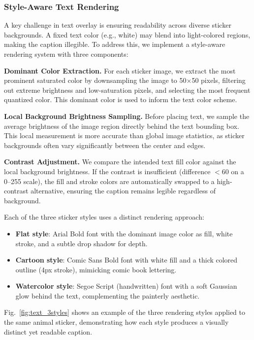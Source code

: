 \subsubsection{\textbf{Style-Aware Text Rendering}}
A key challenge in text overlay is ensuring readability across diverse sticker backgrounds. A fixed text color (e.g., white) may blend into light-colored regions, making the caption illegible. To address this, we implement a style-aware rendering system with three components:

\textbf{Dominant Color Extraction.} For each sticker image, we extract the most prominent saturated color by downsampling the image to 50$\times$50 pixels, filtering out extreme brightness and low-saturation pixels, and selecting the most frequent quantized color. This dominant color is used to inform the text color scheme.

\textbf{Local Background Brightness Sampling.} Before placing text, we sample the average brightness of the image region directly behind the text bounding box. This local measurement is more accurate than global image statistics, as sticker backgrounds often vary significantly between the center and edges.

\textbf{Contrast Adjustment.} We compare the intended text fill color against the local background brightness. If the contrast is insufficient (difference $< 60$ on a 0--255 scale), the fill and stroke colors are automatically swapped to a high-contrast alternative, ensuring the caption remains legible regardless of background.

Each of the three sticker styles uses a distinct rendering approach:
\begin{itemize}
    \item \textbf{Flat style}: Arial Bold font with the dominant image color as fill, white stroke, and a subtle drop shadow for depth.
    \item \textbf{Cartoon style}: Comic Sans Bold font with white fill and a thick colored outline (4px stroke), mimicking comic book lettering.
    \item \textbf{Watercolor style}: Segoe Script (handwritten) font with a soft Gaussian glow behind the text, complementing the painterly aesthetic.
\end{itemize}

Fig.~\ref{fig:text_3styles} shows an example of the three rendering styles applied to the same animal sticker, demonstrating how each style produces a visually distinct yet readable caption.

